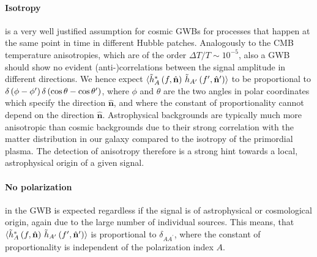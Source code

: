 \paragraph{Isotropy} is a very well justified assumption for cosmic \acp{GWB} for processes that happen at the same point in time in different Hubble patches. Analogously to the \ac{CMB} temperature anisotropies, which are of the order $\Delta T / T \sim 10^{-5}$, also a \ac{GWB} should show no evident (anti-)correlations between the signal amplitude in different directions. We hence expect $\langle \tilde{h}_A^* \left( f, \hat{\mathbf{n}} \right) \, \tilde{h}_{A^\prime} \left( f^\prime, \hat{\mathbf{n}}^\prime \right) \rangle$ to be proportional to $\delta\left( \phi - \phi^\prime \right) \delta \left( \cos \theta - \cos \theta^\prime \right)$, where $\phi$ and $\theta$  are the two angles in polar coordinates which specify the direction $\hat{\mathbf{n}}$, and  where the constant of proportionality cannot depend on the direction $\hat{\mathbf{n}}$. Astrophysical backgrounds are typically much more anisotropic than cosmic backgrounds due to their strong correlation with the matter distribution in our galaxy compared to the isotropy of the primordial plasma. The detection of anisotropy therefore is a strong hint towards a local, astrophysical origin of a given signal.

\paragraph{No polarization} in the \ac{GWB} is expected regardless if the signal is of astrophysical or cosmological origin, again due to the large number of individual sources. This means, that  $\langle \tilde{h}_A^* \left( f, \hat{\mathbf{n}} \right) \, \tilde{h}_{A^\prime} \left( f^\prime, \hat{\mathbf{n}}^\prime \right) \rangle$ is proportional to $\delta_{A A^\prime}$, where the constant of proportionality is independent of the polarization index $A$. 

